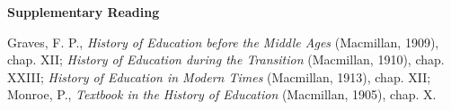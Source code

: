 \documentclass[]{book}
\begin{document}
\textbf{Supplementary Reading}

Graves, F. P., \emph{History of Education before the Middle Ages} (Macmillan, 1909), chap. XII; \emph{History of Education during the Transition} (Macmillan, 1910), chap. XXIII; \emph{History of Education in Modern Times} (Macmillan, 1913), chap. XII; Monroe, P., \emph{Textbook in the History of Education} (Macmillan, 1905), chap. X.


\end{document}
